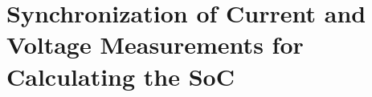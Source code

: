 \chapter{Synchronization of Current and Voltage Measurements for Calculating the SoC}\label{ch:Synchronization of Current and Voltage Measurements for Calculating the SoC}


